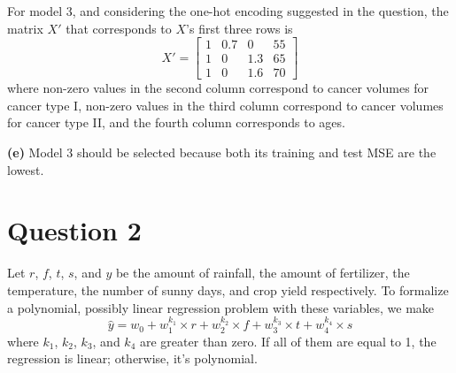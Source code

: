 \documentclass[leqno]{article}
\begin{document}
\noindent For model 3, and considering the one-hot encoding suggested in the question, the matrix $X'$ that corresponds to $X$'s first three rows is
\[
X'=
  \begin{bmatrix}
    1 & 0.7 & 0 & 55\\
    1 & 0 & 1.3 & 65 \\
    1 & 0 & 1.6 & 70
  \end{bmatrix}
\]
where non-zero values in the second column correspond to cancer volumes for cancer type I, non-zero values in the third column correspond to cancer 
volumes for cancer type II, and the fourth column corresponds to ages.   


\hfill

\noindent \textbf{(e)} Model 3 should be selected because both its training and test MSE are the lowest.


\hfill

\section*{Question 2} Let $r$, $f$, $t$, $s$, and $y$ be the amount of rainfall, the amount of fertilizer, the temperature, the number of sunny days, and 
crop yield respectively. To formalize a polynomial, possibly linear regression problem with these variables, we make
\begin{equation*}
\hat{y} = w_0 + w_1^{k_1} \times r + w_2^{k_2} \times f + w_3^{k_3} \times t + w_4^{k_4} \times s
\end{equation*}
where $k_1$, $k_2$, $k_3$, and $k_4$ are greater than zero. If all of them are equal to 1, the regression is linear; otherwise, it's polynomial.
\end{document}

